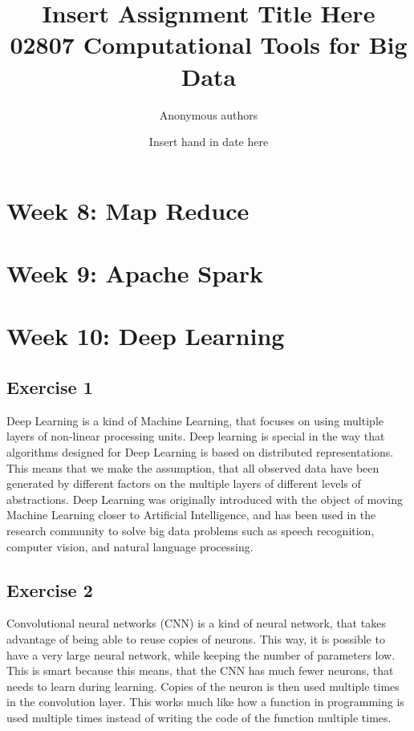 \documentclass{article}
\title{Insert Assignment Title Here\\02807 Computational Tools for Big Data}
\author{Anonymous authors}
\date{Insert hand in date here}
\begin{document}
\maketitle

\section{Week 8: Map Reduce}

\section{Week 9: Apache Spark}

\section{Week 10: Deep Learning}

\subsection{Exercise 1}

Deep Learning is a kind of Machine Learning, that focuses on using multiple layers of non-linear processing units. Deep learning is special in the way that algorithms designed for Deep Learning is based on distributed representations. This means that we make the assumption, that all observed data have been generated by different factors on the multiple layers of different levels of abstractions. Deep Learning was originally introduced with the object of moving Machine Learning closer to Artificial Intelligence, and has been used in the research community to solve big data problems such as speech recognition, computer vision, and natural language processing.


\subsection{Exercise 2}

Convolutional neural networks (CNN) is a kind of neural network, that takes advantage of being able to reuse copies of neurons. This way, it is possible to have a very large neural network, while keeping the number of parameters low. This is smart because this means, that the CNN has much fewer neurons, that needs to learn during learning. Copies of the neuron is then used multiple times in the convolution layer. This works much like how a function in programming is used multiple times instead of writing the code of the function multiple times.
\end{document}
